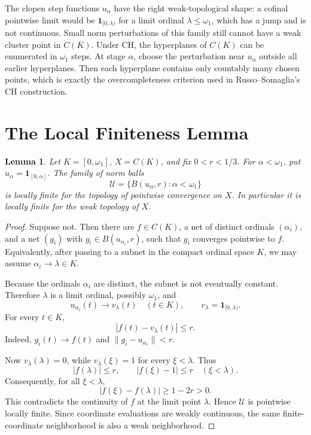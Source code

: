 \documentclass[11pt]{article}
\newtheorem{lemma}{Lemma}
\begin{document}
The clopen step functions \(u_\alpha\) have the right weak-topological shape:
a cofinal pointwise limit would be \(\mathbf 1_{[0,\lambda)}\) for a limit
ordinal \(\lambda\leq\omega_1\), which has a jump and is not continuous. Small
norm perturbations of this family still cannot have a weak cluster point in
\(C(K)\). Under CH, the hyperplanes of \(C(K)\) can be enumerated in
\(\omega_1\) steps. At stage \(\alpha\), choose the perturbation near
\(u_\alpha\) outside all earlier hyperplanes. Then each hyperplane contains
only countably many chosen points, which is exactly the overcompleteness
criterion used in Russo--Somaglia's CH construction.

\section*{The Local Finiteness Lemma}

\begin{lemma}
Let \(K=[0,\omega_1]\), \(X=C(K)\), and fix \(0<r<1/3\).  For
\(\alpha<\omega_1\), put \(u_\alpha=\mathbf 1_{[0,\alpha]}\).  The family of
norm balls
\[
\mathcal U=\{B(u_\alpha,r):\alpha<\omega_1\}
\]
is locally finite for the topology of pointwise convergence on \(X\). In
particular it is locally finite for the weak topology of \(X\).
\end{lemma}

\begin{proof}
Suppose not. Then there are \(f\in C(K)\), a net of distinct ordinals
\((\alpha_i)\), and a net \((g_i)\) with \(g_i\in B(u_{\alpha_i},r)\), such
that \(g_i\) converges pointwise to \(f\). Equivalently, after passing to a
subnet in the compact ordinal space \(K\), we may assume
\(\alpha_i\to\lambda\in K\).

Because the ordinals \(\alpha_i\) are distinct, the subnet is not eventually
constant. Therefore \(\lambda\) is a limit ordinal, possibly \(\omega_1\), and
\[
u_{\alpha_i}(t)\longrightarrow v_\lambda(t)
\quad(t\in K),
\qquad
v_\lambda=\mathbf 1_{[0,\lambda)}.
\]
For every \(t\in K\),
\[
|f(t)-v_\lambda(t)|\leq r.
\]
Indeed, \(g_i(t)\to f(t)\) and \(\|g_i-u_{\alpha_i}\|<r\).

Now \(v_\lambda(\lambda)=0\), while \(v_\lambda(\xi)=1\) for every
\(\xi<\lambda\). Thus
\[
|f(\lambda)|\leq r,
\qquad
|f(\xi)-1|\leq r\quad(\xi<\lambda).
\]
Consequently, for all \(\xi<\lambda\),
\[
|f(\xi)-f(\lambda)|\geq 1-2r>0.
\]
This contradicts the continuity of \(f\) at the limit point \(\lambda\).
Hence \(\mathcal U\) is pointwise locally finite. Since coordinate
evaluations are weakly continuous, the same finite-coordinate neighborhood is
also a weak neighborhood.
\end{proof}
\end{document}
